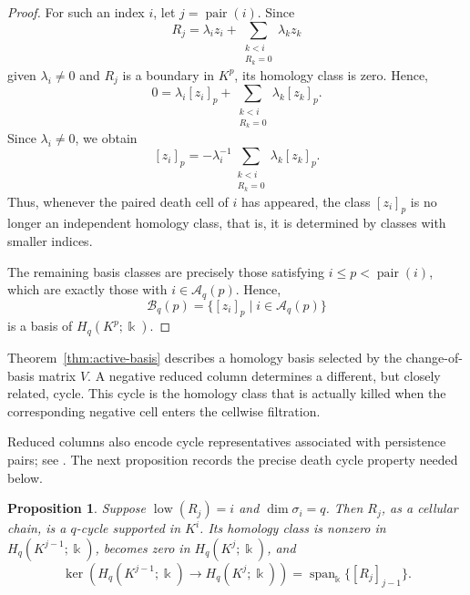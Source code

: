 \documentclass[11pt]{article}
\theoremstyle{paperdefinition}
\theoremstyle{paperplain}
\newtheorem{proposition}[definition]{Proposition}
\theoremstyle{paperremark}
\newcommand{\R}{\mathbb{R}}
\begin{document}
\begin{proof}
For such an index $i$, let $j=\operatorname{pair}(i)$. Since
\[
R_j = \lambda_i z_i + \sum_{\substack{k<i\\R_k=0}} \lambda_k z_k
\]
given $\lambda_i \neq 0$ and $R_j$ is a boundary in $K^p$, its homology class is zero. Hence,
\[
0 = \lambda_i[z_i]_p + \sum_{\substack{k<i\\R_k=0}}\lambda_k[z_k]_p.
\]
Since $\lambda_i\neq0$, we obtain
\[
[z_i]_p = -\lambda_i^{-1}\sum_{\substack{k<i\\R_k=0}}\lambda_k[z_k]_p.
\]
Thus, whenever the paired death cell of $i$ has appeared, the class $[z_i]_p$ is no longer an independent homology class, that is, it is determined by classes with smaller indices.

The remaining basis classes are precisely those satisfying $i\leq p<\operatorname{pair}(i)$, which are exactly those with $i\in\mathcal A_q(p)$. Hence,
\[
\mathcal B_q(p) = \{[z_i]_p\mid i\in\mathcal A_q(p)\}
\]
is a basis of $H_q(K^p;\Bbbk)$.
\end{proof}

Theorem~\ref{thm:active-basis} describes a homology basis selected by the change-of-basis matrix $V$. A negative reduced column determines a different, but closely related, cycle. This cycle is the homology class that is actually killed when the corresponding negative cell enters the cellwise filtration.

Reduced columns also encode cycle representatives associated with persistence pairs; see \cite{edelsbrunnerharer2010computational,hang2021umatch}. The next proposition records the precise death cycle property needed below.

\begin{proposition}
\label{prop:killed-cycle}
Suppose $\operatorname{low}(R_j)=i$ and $\dim\sigma_i=q$. Then $R_j$, as a cellular chain, is a $q$-cycle supported in $K^i$. Its homology class is nonzero in $H_q(K^{j-1};\Bbbk)$, becomes zero in $H_q(K^j;\Bbbk)$, and
\[
\ker\!\left(H_q(K^{j-1};\Bbbk) \longrightarrow H_q(K^j;\Bbbk)\right) = \operatorname{span}_{\Bbbk}\{[R_j]_{j-1}\}.
\]
\end{proposition}
\end{document}
